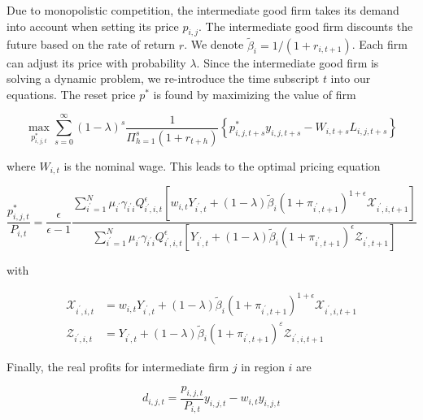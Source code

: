 \documentclass[10pt]{article}
\begin{document}
Due to monopolistic competition, the intermediate good firm takes its demand into account when setting its price $p_{i, j}$. The intermediate good firm discounts the future based on the rate of return $r$. We denote $\tilde{\beta}_{i}=1 /\left(1+r_{i, t+1}\right)$. Each firm can adjust its price with probability $\lambda$. Since the intermediate good firm is solving a dynamic problem, we re-introduce the time subscript $t$ into our equations. The reset price $p^{*}$ is found by maximizing the value of firm


\begin{equation*}
\max _{p_{i, j, t}^{*}} \sum_{s=0}^{\infty}(1-\lambda)^{s} \frac{1}{\Pi_{h=1}^{s}\left(1+r_{t+h}\right)}\left\{p_{i, j, t+s}^{*} y_{i, j, t+s}-W_{i, t+s} L_{i, j, t+s}\right\} \tag{4.16}
\end{equation*}


where $W_{i, t}$ is the nominal wage. This leads to the optimal pricing equation


\begin{equation*}
\frac{p_{i, j, t}^{*}}{P_{i, t}}=\frac{\epsilon}{\epsilon-1} \frac{\sum_{i^{\prime}=1}^{N} \mu_{i^{\prime}} \gamma_{i^{\prime} i} Q_{i^{\prime}, i, t}^{\epsilon}\left[w_{i, t} Y_{i^{\prime}, t}+(1-\lambda) \tilde{\beta}_{i}\left(1+\pi_{i^{\prime}, t+1}\right)^{1+\epsilon} \mathcal{X}_{i^{\prime}, i, t+1}\right]}{\sum_{i^{\prime}=1}^{N} \mu_{i^{\prime}} \gamma_{i^{\prime} i} Q_{i^{\prime}, i, t}^{\epsilon}\left[Y_{i^{\prime}, t}+(1-\lambda) \tilde{\beta}_{i}\left(1+\pi_{i^{\prime}, t+1}\right)^{\epsilon} \mathcal{Z}_{i^{\prime}, t+1}\right]} \tag{4.17}
\end{equation*}


with


\begin{align*}
\mathcal{X}_{i^{\prime}, i, t} & =w_{i, t} Y_{i^{\prime}, t}+(1-\lambda) \tilde{\beta}_{i}\left(1+\pi_{i^{\prime}, t+1}\right)^{1+\epsilon} \mathcal{X}_{i^{\prime}, i, t+1}  \tag{4.18}\\
\mathcal{Z}_{i^{\prime}, i, t} & =Y_{i^{\prime}, t}+(1-\lambda) \tilde{\beta}_{i}\left(1+\pi_{i^{\prime}, t+1}\right)^{\varepsilon} \mathcal{Z}_{i^{\prime}, i, t+1} \tag{4.19}
\end{align*}


Finally, the real profits for intermediate firm $j$ in region $i$ are


\begin{equation*}
d_{i, j, t}=\frac{p_{i, j, t}}{P_{i, t}} y_{i, j, t}-w_{i, t} y_{i, j, t} \tag{4.20}
\end{equation*}
\end{document}
